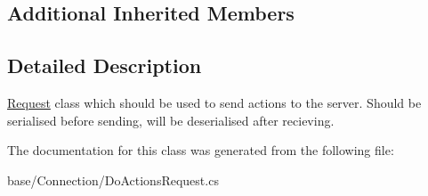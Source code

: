 \subsection*{Additional Inherited Members}


\subsection{Detailed Description}
\hyperlink{classCore_1_1Connections_1_1Request}{Request} class which should be used to send actions to the server. Should be serialised before sending, will be deserialised after recieving. 



The documentation for this class was generated from the following file\-:\begin{DoxyCompactItemize}
\item 
base/\-Connection/Do\-Actions\-Request.\-cs\end{DoxyCompactItemize}

